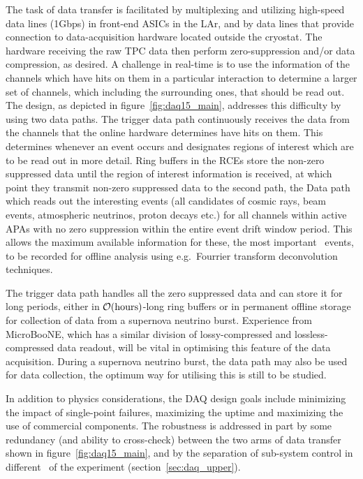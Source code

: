 The task of data transfer is facilitated by multiplexing and utilizing
high-speed data lines (1Gbps) in front-end ASICs in the LAr, and by
data lines that
provide connection to data-acquisition hardware located outside the
cryostat.  The hardware receiving the raw TPC data then perform
zero-suppression and/or data compression, as desired.  A challenge in
real-time is to use the information of the channels which have hits on
them in a particular interaction to determine a larger set of
channels, which including the surrounding ones, that should be read
out.  The design, as depicted in figure~\ref{fig:daq15_main},
addresses this difficulty by using two data paths.  The trigger data
path continuously receives the data from the channels that the online
hardware determines have hits on them.  This determines whenever an
event occurs and designates regions of interest which are to be read
out in more detail.  Ring buffers in the RCEs store the non-zero
suppressed data until the region of interest information is received,
at which point they transmit non-zero suppressed data to the second
path, the Data path which reads out the interesting events (all
candidates of cosmic rays, beam events, atmospheric neutrinos, proton
decays etc.) for all channels within active APAs with no zero
suppression within the entire event drift window period.  This allows
the maximum available information for these, the most important \LBNE\
events, to be recorded for offline analysis using e.g.\ Fourrier
transform deconvolution techniques.

The trigger data path handles all the zero suppressed data and can
store it for long periods, either in ${\cal O}(\mathrm{hours})$-long
ring buffers or in permanent offline storage for collection of data
from a supernova neutrino burst.  Experience from MicroBooNE, which
has a similar division of lossy-compressed and lossless-compressed
data readout, will be vital in optimising this feature of the data
acquisition.  During a supernova neutrino burst, the data path may
also be used for data collection, the optimum way for utilising this
is still to be studied.

In addition to physics considerations, the DAQ design goals include
minimizing the impact of single-point failures, maximizing the uptime
and maximizing the use of commercial components.  The robustness is
addressed in part by some redundancy (and ability to cross-check)
between the two arms of data transfer shown in
figure~\ref{fig:daq15_main}, and by the separation of sub-system
control in different \COMPARTMENTS\ of the experiment
(section~\ref{sec:daq_upper}).


